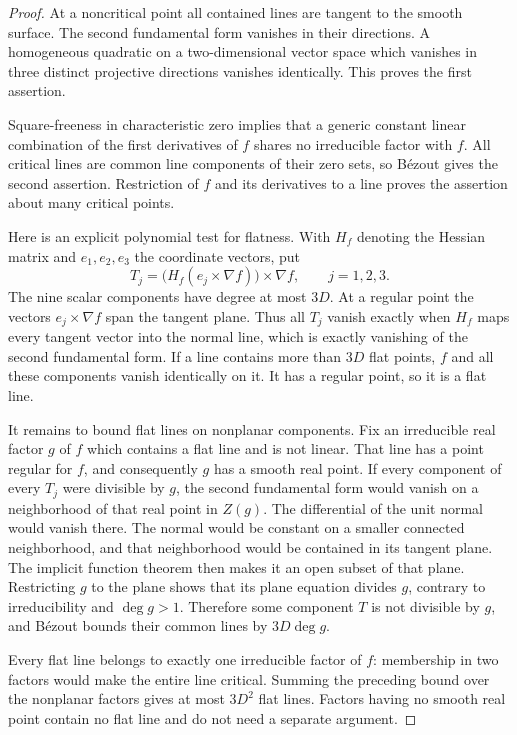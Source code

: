 \begin{proof}
At a noncritical point all contained lines are tangent to the smooth
surface.  The second fundamental form vanishes in their directions.
A homogeneous quadratic on a two-dimensional vector space which
vanishes in three distinct projective directions vanishes identically.
This proves the first assertion.

Square-freeness in characteristic zero implies that a generic constant
linear combination of the first derivatives of $f$ shares no
irreducible factor with $f$.  All critical lines are common line
components of their zero sets, so B\'ezout gives the second assertion.
Restriction of $f$ and its derivatives to a line proves the assertion
about many critical points.

Here is an explicit polynomial test for flatness.  With $H_f$ denoting
the Hessian matrix and $e_1,e_2,e_3$ the coordinate vectors, put
\[
 T_j=\bigl(H_f(e_j\mathbin\times\nabla f)\bigr)
                  \mathbin\times\nabla f,\qquad j=1,2,3.
\]
The nine scalar components have degree at most $3D$.  At a regular
point the vectors $e_j\times\nabla f$ span the tangent plane.  Thus
all $T_j$ vanish exactly when $H_f$ maps every tangent vector into
the normal line, which is exactly vanishing of the second fundamental
form.  If a line contains more than $3D$ flat points, $f$ and all these
components vanish identically on it.  It has a regular point, so it is
a flat line.

It remains to bound flat lines on nonplanar components.  Fix an
irreducible real factor $g$ of $f$ which contains a flat line and is
not linear.  That line has a point regular for $f$, and consequently
$g$ has a smooth real point.  If every component of every $T_j$ were
divisible by $g$, the second fundamental form would vanish on a
neighborhood of that real point in $Z(g)$.  The differential of the
unit normal would vanish there.  The normal would be constant on a
smaller connected neighborhood, and that neighborhood would be
contained in its tangent plane.  The implicit function theorem then
makes it an open subset of that plane.  Restricting $g$ to the plane
shows that its plane equation divides $g$, contrary to irreducibility
and $\deg g>1$.  Therefore some component $T$ is not divisible by
$g$, and B\'ezout bounds their common lines by $3D\deg g$.

Every flat line belongs to exactly one irreducible factor of $f$:
membership in two factors would make the entire line critical.
Summing the preceding bound over the nonplanar factors gives at most
$3D^2$ flat lines.  Factors having no smooth real point contain no
flat line and do not need a separate argument.
\end{proof}


